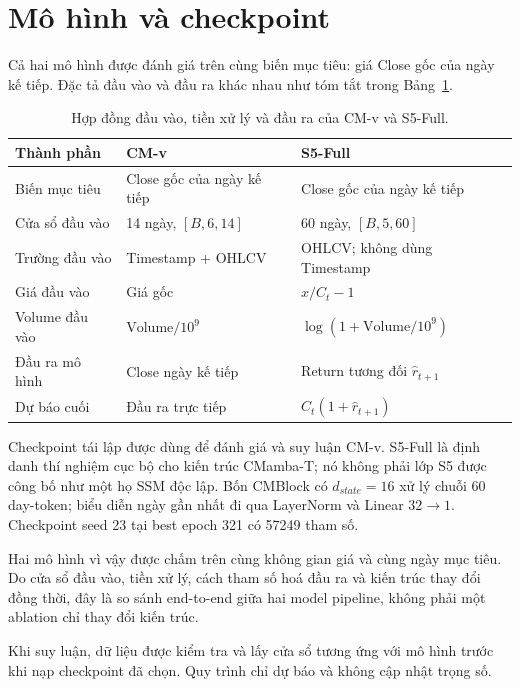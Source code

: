 \documentclass[13pt,a4paper,oneside]{report}
\begin{document}
\section{Mô hình và checkpoint}\label{sec:model-contracts}
Cả hai mô hình được đánh giá trên cùng biến mục tiêu: giá Close gốc của ngày kế tiếp. Đặc tả đầu vào
và đầu ra khác nhau như tóm tắt trong Bảng~\ref{tab:model-contracts}.

\begin{table}[H]
\centering
\caption{Hợp đồng đầu vào, tiền xử lý và đầu ra của CM-v và S5-Full.}
\label{tab:model-contracts}
{\small
\begin{tabularx}{\linewidth}{@{}lXX@{}}
\toprule
\textbf{Thành phần} & \textbf{CM-v} & \textbf{S5-Full} \\
\midrule
Biến mục tiêu & Close gốc của ngày kế tiếp & Close gốc của ngày kế tiếp \\
Cửa sổ đầu vào & 14 ngày, $[B,6,14]$ & 60 ngày, $[B,5,60]$ \\
Trường đầu vào & Timestamp + OHLCV & OHLCV; không dùng Timestamp \\
Giá đầu vào & Giá gốc & $x/C_t-1$ \\
Volume đầu vào & $\mathrm{Volume}/10^9$ & $\log(1+\mathrm{Volume}/10^9)$ \\
Đầu ra mô hình & Close ngày kế tiếp & Return tương đối $\widehat r_{t+1}$ \\
Dự báo cuối & Đầu ra trực tiếp & $C_t(1+\widehat r_{t+1})$ \\
\bottomrule
\end{tabularx}}
\end{table}

Checkpoint tái lập được dùng để đánh giá và suy luận CM-v. S5-Full là định danh thí nghiệm cục bộ
cho kiến trúc CMamba-T; nó không phải lớp S5 được công bố như một họ SSM độc lập. Bốn CMBlock có
$d_{state}=16$ xử lý chuỗi 60 day-token; biểu diễn ngày gần nhất đi qua LayerNorm và Linear
$32\to1$. Checkpoint seed 23 tại best epoch 321 có \num{57249} tham số.

Hai mô hình vì vậy được chấm trên cùng không gian giá và cùng ngày mục tiêu. Do cửa sổ đầu vào,
tiền xử lý, cách tham số hoá đầu ra và kiến trúc thay đổi đồng thời, đây là so sánh end-to-end giữa
hai model pipeline, không phải một ablation chỉ thay đổi kiến trúc.

Khi suy luận, dữ liệu được kiểm tra và lấy cửa sổ tương ứng với mô hình trước khi nạp checkpoint đã
chọn. Quy trình chỉ dự báo và không cập nhật trọng số.
\end{document}
